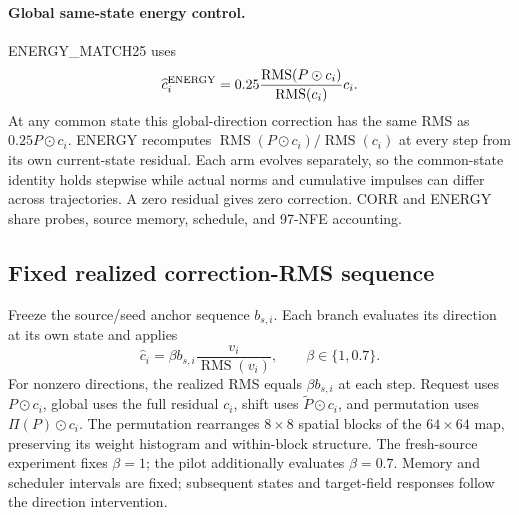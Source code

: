 \documentclass[conference]{IEEEtran}
\newcommand{\RMS}{\operatorname{RMS}}
\begin{document}
\paragraph{Global same-state energy control.}
ENERGY\_MATCH25 uses
\begin{equation}
\widehat c_i^{\rm ENERGY}=0.25\frac{\RMS(P\odot c_i)}{\RMS(c_i)}c_i.
\label{eq:energy-control}
\end{equation}
At any common state this global-direction correction has the same RMS as $0.25P\odot c_i$. ENERGY recomputes $\RMS(P\odot c_i)/\RMS(c_i)$ at every step from its own current-state residual. Each arm evolves separately, so the common-state identity holds stepwise while actual norms and cumulative impulses can differ across trajectories. A zero residual gives zero correction. CORR and ENERGY share probes, source memory, schedule, and 97-NFE accounting.

\subsection{Fixed realized correction-RMS sequence}
Freeze the source/seed anchor sequence $b_{s,i}$. Each branch evaluates its direction at its own state and applies
\begin{equation}
\widehat c_i=\beta b_{s,i}\frac{v_i}{\operatorname{RMS}(v_i)},\qquad
\beta\in\{1,0.7\}.
\label{eq:r86-profile}
\end{equation}
For nonzero directions, the realized RMS equals $\beta b_{s,i}$ at each step. Request uses $P\odot c_i$, global uses the full residual $c_i$, shift uses $\widetilde P\odot c_i$, and permutation uses $\Pi(P)\odot c_i$. The permutation rearranges $8\times8$ spatial blocks of the $64\times64$ map, preserving its weight histogram and within-block structure. The fresh-source experiment fixes $\beta=1$; the pilot additionally evaluates $\beta=0.7$. Memory and scheduler intervals are fixed; subsequent states and target-field responses follow the direction intervention.
\end{document}
